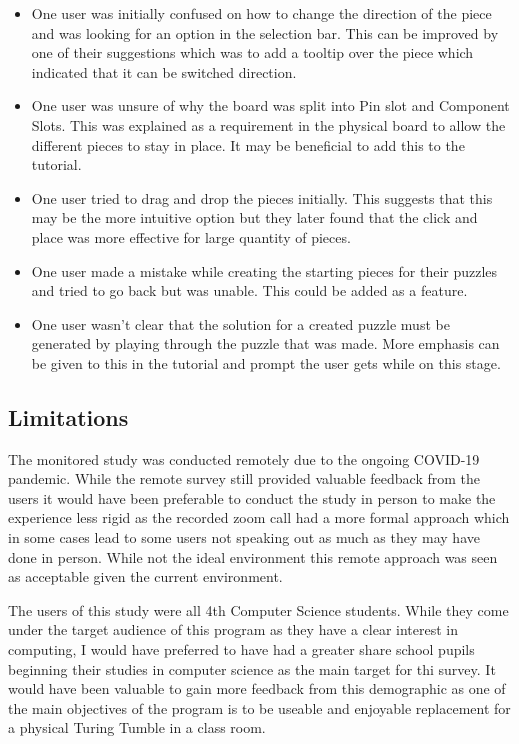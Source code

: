 \documentclass{l4proj}
\begin{document}
\begin{itemize}
    \item One user was initially confused on how to change the direction of the piece and was looking for an option in the selection bar. This can be improved by one of their suggestions which was to add a tooltip over the piece which indicated that it can be switched direction. 
    \item One user was unsure of why the board was split into Pin slot and Component Slots. This was explained as a requirement in the physical board to allow the different pieces to stay in place. It may be beneficial to add this to the tutorial.  
    \item One user tried to drag and drop the pieces initially. This suggests that this may be the more intuitive option but they later found that the click and place was more effective for large quantity of pieces.
    \item One user made a mistake while creating the starting pieces for their puzzles and tried to go back but was unable. This could be added as a feature. 
    \item One user wasn't clear that the solution for a created puzzle must be generated by playing through the puzzle that was made. More emphasis can be given to this in the tutorial and prompt the user gets while on this stage.
\end{itemize}

\subsection{Limitations}
The monitored study was conducted remotely due to the ongoing COVID-19 pandemic. While the remote survey still provided valuable feedback from the users it would have been preferable to conduct the study in person to make the experience less rigid as the recorded zoom call had a more formal approach which in some cases lead to some users not speaking out as much as they may have done in person. While not the ideal environment this remote approach was seen as acceptable given the current environment.

The users of this study were all 4th Computer Science students. While they come under the target audience of this program as they have a clear interest in computing, I would have preferred to have had a greater share school pupils beginning their studies in computer science as the main target for thi survey. It would have been valuable to gain more feedback from this demographic as one of the main objectives of the program is to be useable and enjoyable replacement for a physical Turing Tumble in a class room. 
\end{document}

